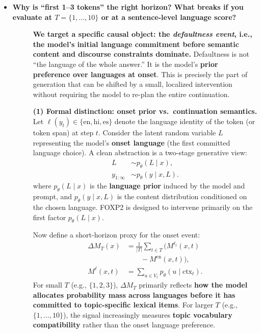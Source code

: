 \begin{itemize}[leftmargin=1.5em]
\item[\ding{93}] \textbf{Why is “first 1–3 tokens” the right horizon? What breaks if you evaluate at $T=\{1,\dots,10\}$ or at a sentence-level language score?}
\begin{description}
\item[] \textbf{We target a specific causal object: the \emph{defaultness event}, i.e., the model’s \textbf{initial language commitment} before semantic content and discourse constraints dominate.}
Defaultness is not “the language of the whole answer.” It is the model’s \textbf{prior preference over languages at onset}. This is precisely the part of generation that can be shifted by a small, localized intervention without requiring the model to re-plan the entire continuation.

\vspace{4pt}
\textbf{(1) Formal distinction: onset prior vs.\ continuation semantics.}
Let $\ell(y_t)\in\{\mathrm{en},\mathrm{hi},\mathrm{es}\}$ denote the language identity of the token (or token span) at step $t$. Consider the latent random variable $L$ representing the model’s \textbf{onset language} (the first committed language choice). A clean abstraction is a two-stage generative view:
\[
\begin{aligned}
L &\sim p_\theta(L\mid x),\\
y_{1:\infty} &\sim p_\theta(y\mid x, L).
\end{aligned}
\]
where $p_\theta(L\mid x)$ is the \textbf{language prior} induced by the model and prompt, and $p_\theta(y\mid x,L)$ is the content distribution conditioned on the chosen language. FOXP2 is designed to intervene primarily on the first factor $p_\theta(L\mid x)$.

Now define a short-horizon proxy for the onset event:
\[
\begin{aligned}
\Delta M_T(x)
&= \frac{1}{|T|}\sum_{t\in T}
   \Big( M^{\ell_t}(x,t) \\
&\qquad - M^{\mathrm{en}}(x,t) \Big),\\
M^{\ell}(x,t)
&= \sum_{u\in V_\ell} p_\theta(u\mid \mathrm{ctx}_t).
\end{aligned}
\]
For small $T$ (e.g., $\{1,2,3\}$), $\Delta M_T$ primarily reflects \textbf{how the model allocates probability mass across languages before it has committed to topic-specific lexical items}. For larger $T$ (e.g., $\{1,\dots,10\}$), the signal increasingly measures \textbf{topic vocabulary compatibility} rather than the onset language preference.


\end{description}
\end{itemize}
